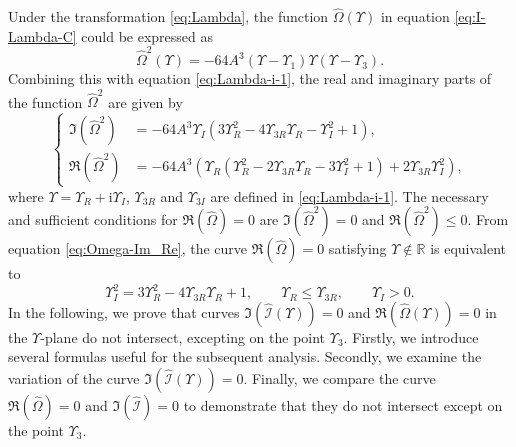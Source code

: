 \documentclass[11pt,reqno]{amsart}
\newcommand{\ii}{\mathrm{i}}
\numberwithin{equation}{section}
\begin{document}
\begin{proof-spec-cn}
	Under the transformation \eqref{eq:Lambda}, the function $\hat{\Omega}(\Upsilon)$ in equation \eqref{eq:I-Lambda-C} could be expressed as
	\begin{equation}\nonumber
		\hat{\Omega}^2(\Upsilon)=-64A^3 \left(\Upsilon -\Upsilon_1\right)\Upsilon\left(\Upsilon -\Upsilon_3\right).
	\end{equation}
	Combining this with equation \eqref{eq:Lambda-i-1}, the real and imaginary parts of the function $\hat{\Omega}^2$ are given by
	\begin{equation}\label{eq:Omega-Im_Re}
		\left\{\begin{aligned}
			{\Im}(\hat{\Omega}^2)&=-64A^3\Upsilon_I\left(3\Upsilon_R^2-4\Upsilon_{3R}\Upsilon_R-\Upsilon_I^2+1\right),\\
			{\Re}(\hat{\Omega}^2)&=-64A^3\left(\Upsilon_R(\Upsilon_R^2-2\Upsilon_{3R}\Upsilon_R-3\Upsilon_I^2+1)+2\Upsilon_{3R}\Upsilon_I^2\right),
		\end{aligned} \right.
	\end{equation}
	where $\Upsilon=\Upsilon_{R}+\ii \Upsilon_I$, $\Upsilon_{3R}$ and $\Upsilon_{3I}$ are defined in \eqref{eq:Lambda-i-1}.
	The necessary and sufficient conditions for ${\Re}(\hat{\Omega})=0$ are ${\Im}(\hat{\Omega}^2)=0$ and ${\Re}(\hat{\Omega}^2)\le 0$. 
	From equation \eqref{eq:Omega-Im_Re}, the curve ${\Re}(\hat{\Omega})=0$ satisfying $\Upsilon\notin \mathbb{R}$ is equivalent to
	\begin{equation}\label{eq:Omega-condition}
		\Upsilon_I^2=3\Upsilon_R^2-4\Upsilon_{3R}\Upsilon_R+1, \qquad \Upsilon_R\le \Upsilon_{3R}, \qquad \Upsilon_I>0.
	\end{equation}
	In the following, 
	we prove that curves ${\Im}(\hat{\mathcal{I}}(\Upsilon))=0$ and ${\Re}(\hat{\Omega}(\Upsilon))=0$ in the $\Upsilon$-plane do not intersect, excepting on the point $\Upsilon_3$.
	Firstly, we introduce several formulas useful for the subsequent analysis. Secondly, we examine the variation of the curve ${\Im}( \hat{\mathcal{I}} (\Upsilon))=0$. Finally, we compare the curve $\Re(\hat{\Omega})=0$ and $\Im(\hat{\mathcal{I}})=0$ to demonstrate that they do not intersect except on the point $\Upsilon_3$.


\end{proof-spec-cn}
\end{document}
